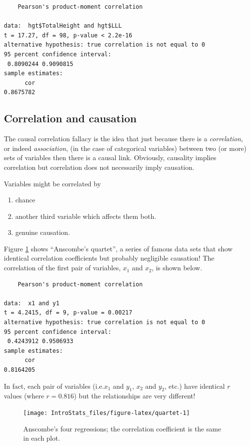 \documentclass[
  oneside]{krantz}
\providecommand{\tightlist}{%
  \setlength{\itemsep}{0pt}\setlength{\parskip}{0pt}}
\begin{document}
\begin{verbatim}
    Pearson's product-moment correlation

data:  hgt$TotalHeight and hgt$LLL
t = 17.27, df = 98, p-value < 2.2e-16
alternative hypothesis: true correlation is not equal to 0
95 percent confidence interval:
 0.8090244 0.9090815
sample estimates:
      cor 
0.8675782 
\end{verbatim}

\hypertarget{correlation-and-causation}{%
\subsection{Correlation and causation}\label{correlation-and-causation}}

The causal correlation fallacy is the idea that just because there is a \emph{correlation}, or indeed \emph{association}, (in the case of categorical variables) between two (or more) sets of variables then there is a causal link. Obviously, causality implies correlation but correlation does not necessarily imply causation.

Variables might be correlated by

\begin{enumerate}
\def\labelenumi{\alph{enumi})}
\tightlist
\item
  chance
\item
  another third variable which affects them both.
\item
  genuine causation.
\end{enumerate}

Figure \ref{fig:quartet} shows ``Anscombe's quartet'', a series of famous data sets that show identical correlation coefficients but probably negligible causation! The correlation of the first pair of variables, \(x_1\) and \(x_2\), is shown below.

\begin{verbatim}
    Pearson's product-moment correlation

data:  x1 and y1
t = 4.2415, df = 9, p-value = 0.00217
alternative hypothesis: true correlation is not equal to 0
95 percent confidence interval:
 0.4243912 0.9506933
sample estimates:
      cor 
0.8164205 
\end{verbatim}

In fact, each pair of variables (i.e.\(x_1\) and \(y_1\), \(x_2\) and \(y_2\), etc.) have identical \(r\) values (where \(r=0.816\)) but the relationships are very different!

\begin{figure}

{\centering \texttt{[image: IntroStats\_files/figure-latex/quartet-1]} 

}

\caption{Anscombe's four regressions; the correlation coefficient is the same in each plot.}\label{fig:quartet}
\end{figure}
\end{document}
